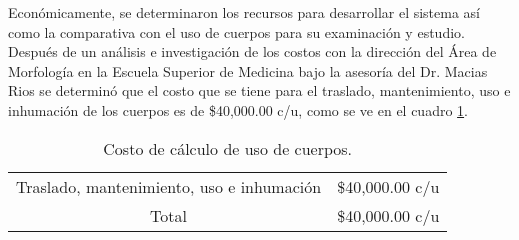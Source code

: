 Económicamente, se determinaron los recursos para desarrollar el sistema así como la comparativa con el uso de cuerpos para su examinación y estudio. Después de un análisis e 
investigación de los costos con la dirección del Área de Morfología en la Escuela Superior de Medicina bajo la asesoría del Dr. Macias Rios se determinó que el costo que se 
tiene para el traslado, mantenimiento, uso e inhumación de los cuerpos es de \$40,000.00 c/u, como se ve en el cuadro \ref{tab:t24}.
\begin{table}[H]
\centering
\begin{tabular}{|
>{\columncolor[HTML]{C0C0C0}}c |l|}
\hline
\multicolumn{2}{|c|}{\cellcolor[HTML]{9B9B9B}\textbf{Costo de uso de cuerpos.}} \\ \hline
Traslado, mantenimiento, uso e inhumación           & \$40,000.00 c/u           \\ \hline
Total                                               & \$40,000.00 c/u           \\ \hline
\end{tabular}
\caption{Costo de cálculo de uso de cuerpos.}
\label{tab:t24}
\end{table}

